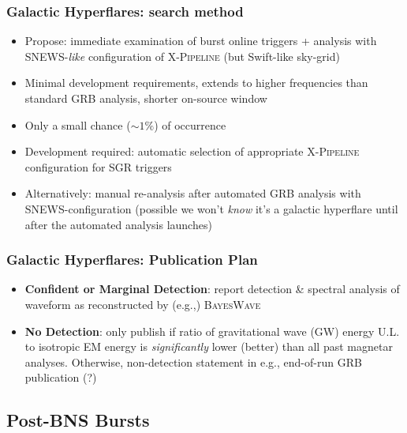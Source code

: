 \documentclass{beamer}
\def\gw#1{gravitational wave#1 (GW#1)\gdef\gw{GW}}
\begin{document}
\begin{frame}
    \frametitle{Galactic Hyperflares: search method}
    \begin{itemize}
        \item Propose: immediate examination of burst online triggers + analysis
            with SNEWS-\emph{like} configuration of \textsc{X-Pipeline} (but Swift-like
            sky-grid)
        \item Minimal development requirements, extends to higher frequencies
            than standard GRB analysis, shorter on-source window
        \item Only a small chance ($\sim 1\%$) of occurrence
        \item Development required: automatic selection of appropriate
            \textsc{X-Pipeline} configuration for SGR triggers
        \item Alternatively: manual re-analysis after automated GRB analysis
            with SNEWS-configuration (possible we won't \emph{know} it's a
            galactic hyperflare until after the automated analysis launches)
    \end{itemize}
\end{frame}

\begin{frame}
    \frametitle{Galactic Hyperflares: Publication Plan}
    \begin{itemize}
        \item {\bf Confident or Marginal Detection}: report detection \&
            spectral analysis of waveform as reconstructed by (e.g.,)
            \textsc{BayesWave}
        \item {\bf No Detection}: only publish if ratio of \gw{} energy U.L. to
            isotropic EM energy is \emph{significantly} lower (better) than all
            past magnetar analyses.  Otherwise, non-detection statement in e.g.,
            end-of-run GRB publication (?)
    \end{itemize}
\end{frame}

\subsection{Post-BNS Bursts}
\end{document}
